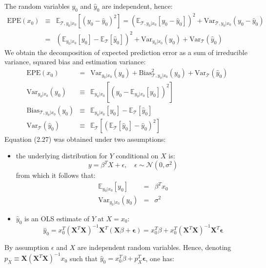 The random variables $y_0$ and $\hat{y}_0$ are independent, hence:
\begin{eqnarray*}
\textrm{EPE}(x_0) & \equiv & \mathbb{E}_{\mathcal{T}, y_0|x_0} \left[ (y_0 - \hat{y}_0)^2 \right] = \left( \mathbb{E}_{\mathcal{T}, y_0|x_0} \left[ y_0 - \hat{y}_0 \right] \right) ^2 + \textrm{Var}_{\mathcal{T}, y_0|x_0} \left( y_0 - \hat{y}_0 \right) \\
& = & \left( \mathbb{E}_{y_0 | x_0}\left[y_0\right] - \mathbb{E}_{\mathcal{T}}\left[\hat{y}_0 \right] \right)^2 + \textrm{Var}_{y_0 | x_0} (y_0) + \textrm{Var}_{\mathcal{T}}(\hat{y}_0) 
\end{eqnarray*}
We obtain the decomposition of expected prediction error as a sum of irreducible variance, squared bias and estimation variance:
\begin{eqnarray}
\textrm{EPE}(x_0) & = & \textrm{Var}_{y_0 | x_0} (y_0) + \textrm{Bias}_{\mathcal{T}, y_0 | x_0}^2(y_0) + \textrm{Var}_\mathcal{T}(\hat{y}_0)\\
\textrm{Var}_{y_0 | x_0} (y_0) & \equiv & \mathbb{E}_{y_0 | x_0}\left[\left(y_0 - \mathbb{E}_{y_0 | x_0}\left[y_0\right]\right)^2 \right]\\
\textrm{Bias}_{\mathcal{T}, y_0 | x_0}(y_0) & \equiv & \mathbb{E}_{y_0 | x_0}\left[y_0\right] - \mathbb{E}_{\mathcal{T}}\left[\hat{y}_0 \right] \\
\textrm{Var}_\mathcal{T}(\hat{y}_0) & \equiv & \mathbb{E}_{\mathcal{T}}\left[\left(\mathbb{E}_{\mathcal{T}}\left[\hat{y}_0 \right] - \hat{y}_0 \right)^2 \right]
\end{eqnarray}
Equation (2.27) was obtained under two assumptions:
\begin{itemize}
	\item the underlying distribution for $Y$ conditional on $X$ is:
	$$
	y = \beta ^T X + \epsilon, \quad \epsilon \sim \mathcal{N}(0, \sigma^2)
	$$
	from which it follows that:
	\begin{eqnarray*}
		\mathbb{E}_{y_0 | x_0}\left[y_0\right] & = & \beta ^T x_0\\
		\textrm{Var}_{y_0 | x_0} (y_0) & = & \sigma^2
	\end{eqnarray*}
	\item $\hat{y}_0$ is an OLS estimate of $Y$ at $X = x_0$:
	$$
	\hat{y}_0 = x_0 ^T \left(\mathbf{X}^T \mathbf{X} \right)^{-1} \mathbf{X}^T \left(\mathbf{X} \beta + \bm{\epsilon}\right) = x_0 ^T \beta + x_0^T \left(\mathbf{X}^T \mathbf{X} \right)^{-1} \mathbf{X}^T \bm{\epsilon}
	$$
\end{itemize}
By assumption $\epsilon$ and $X$ are independent random variables. Hence, denoting $p_X \equiv \mathbf{X} \left( \mathbf{X}^T \mathbf{X} \right)^{-1} x_0$ such that $\hat{y}_0 = x_0^T \beta + p_X^T \bm{\epsilon}$, one has:
